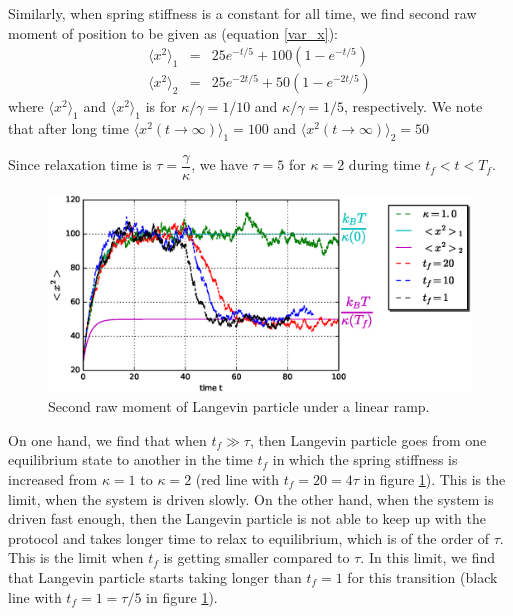 \documentclass[11pt,a4paper]{article}
\begin{document}
Similarly, when spring stiffness is a constant for all time, we find second raw moment of position to be given as (equation \ref{var_x}):
\begin{eqnarray}
\langle x^2  \rangle_1 &=& 25 e^{- t/5} + 100(1-e^{- t/5})\\
\langle x^2  \rangle_2 &=& 25 e^{-2 t/5} + 50(1-e^{-2 t/5})
\end{eqnarray}
where $\langle x^2  \rangle_1$ and $\langle x^2  \rangle_1$ is for $\kappa/\gamma=1/10$ and $\kappa/\gamma=1/5$, respectively. We note that after long time $\langle x^2 (t \rightarrow \infty) \rangle_1 =100 $ and $\langle x^2 (t \rightarrow \infty) \rangle_2 =50 $

Since relaxation time is  $\tau=\dfrac{\gamma}{\kappa}$, we have $\tau=5$ for $\kappa=2$ during time $t_f<t< T_f$.


\begin{figure}[!htbp]
\centering
\includegraphics[scale=0.67]{ramp_sigma_gamma_10_first.eps}
\caption{Second raw moment of Langevin particle under a linear ramp. }
\label{sigma_ramp2a}
\end{figure}
 
On one hand, we find that when $t_f \gg \tau $, then Langevin particle goes from one equilibrium  state to another in the time $t_f$ in which the spring stiffness is increased from $\kappa=1$ to $\kappa=2$ (red line with $t_f=20 =4 \tau$ in figure \ref{sigma_ramp2a}). This is the limit, when the system is driven slowly. On the other hand, when the system is driven fast enough, then the Langevin particle is not able to keep up with the protocol and takes longer time to relax to equilibrium, which is of the order of $\tau$. This is the limit when $t_f$ is getting smaller compared to $\tau$. In this limit,  we find that Langevin particle starts taking longer than $t_f=1$ for this transition (black line with $t_f=1 = \tau/5$ in figure \ref{sigma_ramp2a}).
\end{document}
